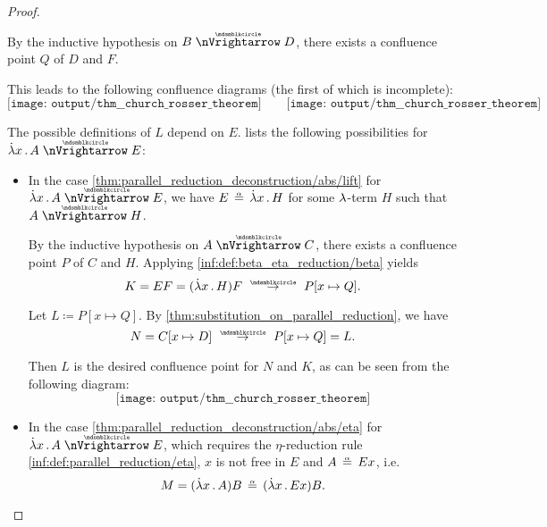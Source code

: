 \begin{proof}
\begin{itemize}
\begin{itemize}
      By the inductive hypothesis on \( B \ppred D \), there exists a confluence point \( Q \) of \( D \) and \( F \).

      This leads to the following confluence diagrams (the first of which is incomplete):
      \begin{equation*}
        \texttt{[image: output/thm\_\_church\_rosser\_theorem]}
        \quad\quad
        \texttt{[image: output/thm\_\_church\_rosser\_theorem]}
      \end{equation*}

      The possible definitions of \( L \) depend on \( E \).  lists the following possibilities for \( \qabs x A \ppred E \):
      \begin{itemize}
        \item In the case \cref{thm:parallel_reduction_deconstruction/abs/lift} for \( \qabs x A \ppred E \), we have \( E \aequiv \qabs x H \) for some \( {\mathrm \lambda} \)-term \( H \) such that \( A \ppred H \).

        By the inductive hypothesis on \( A \ppred C \), there exists a confluence point \( P \) of \( C \) and \( H \). Applying \ref{inf:def:beta_eta_reduction/beta} yields
        \begin{equation*}
          K = EF = (\qabs x H)F \pred P[x \mapsto Q].
        \end{equation*}

        Let \( L \coloneqq P[x \mapsto Q] \). By \cref{thm:substitution_on_parallel_reduction}, we have
        \begin{equation*}
          N = C[x \mapsto D] \pred P[x \mapsto Q] = L.
        \end{equation*}

        Then \( L \) is the desired confluence point for \( N \) and \( K \), as can be seen from the following diagram:
        \begin{equation*}
          \texttt{[image: output/thm\_\_church\_rosser\_theorem]}
        \end{equation*}

        \item In the case \cref{thm:parallel_reduction_deconstruction/abs/eta} for \( \qabs x A \ppred E \), which requires the \( \eta \)-reduction rule \ref{inf:def:parallel_reduction/eta}, \( x \) is not free in \( E \) and \( A \aequiv Ex \), i.e.
        \begin{equation*}
          M = (\qabs x A) B \aequiv (\qabs x E x) B.
        \end{equation*}


\end{itemize}
\end{itemize}
\end{itemize}
\end{proof}

